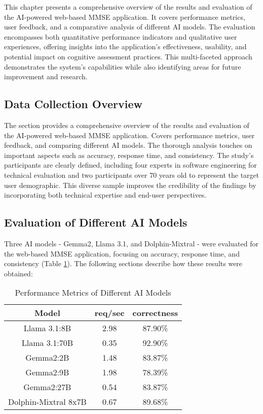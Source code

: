 This chapter presents a comprehensive overview of the results and evaluation of the AI-powered web-based MMSE application. It covers performance metrics, user feedback, and a comparative analysis of different AI models. The evaluation encompasses both quantitative performance indicators and qualitative user experiences, offering insights into the application's effectiveness, usability, and potential impact on cognitive assessment practices. This multi-faceted approach demonstrates the system's capabilities while also identifying areas for future improvement and research.

\subsection{Data Collection Overview}
The section provides a comprehensive overview of the results and evaluation of the AI-powered web-based MMSE application. Covers performance metrics, user feedback, and comparing different AI models. The thorough analysis touches on important aspects such as accuracy, response time, and consistency. The study's participants are clearly defined, including four experts in software engineering for technical evaluation and two participants over 70 years old to represent the target user demographic. This diverse sample improves the credibility of the findings by incorporating both technical expertise and end-user perspectives.

\subsection{Evaluation of Different AI Models}
Three AI models - Gemma2, Llama 3.1, and Dolphin-Mixtral - were evaluated for the web-based MMSE application, focusing on accuracy, response time, and consistency (Table \ref{tab:model_comparison}). The following sections describe how these results were obtained:

\begin{table}[ht]
\centering
\begin{tabular}{|c|c|c|}
\hline
\textbf{Model} & \textbf{req/sec} & \textbf{correctness} \\
\hline
Llama 3.1:8B & 2.98 & 87.90\% \\
Llama 3.1:70B & 0.35 & 92.90\% \\
Gemma2:2B & 1.48 & 83.87\% \\
Gemma2:9B & 1.98 & 78.39\% \\
Gemma2:27B & 0.54 & 83.87\% \\
Dolphin-Mixtral 8x7B & 0.67 & 89.68\% \\
\hline
\end{tabular}
\caption{Performance Metrics of Different AI Models}
\label{tab:model_comparison}
\end{table}

